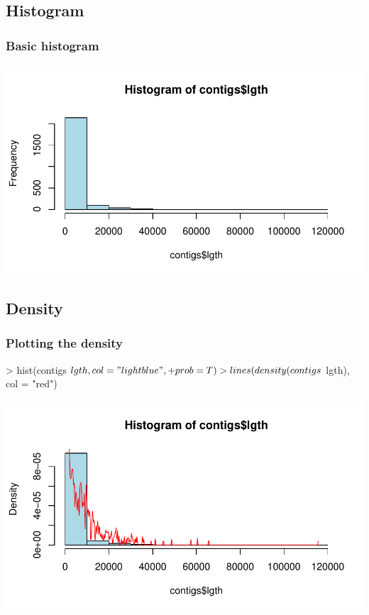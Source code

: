 \subsection{Histogram}

\begin{frame}
  \frametitle{Basic histogram}
\begin{Schunk}
\end{Schunk}
\includegraphics{plots/figura-027}
\end{frame}

\subsection{Density}

\begin{frame}
  \frametitle{Plotting the density}
\begin{Schunk}
\begin{Sinput}
> hist(contigs$lgth, col = "lightblue", 
+     prob = T)
> lines(density(contigs$lgth), col = "red")
\end{Sinput}
\end{Schunk}
\includegraphics{plots/figura-028}
\end{frame}

